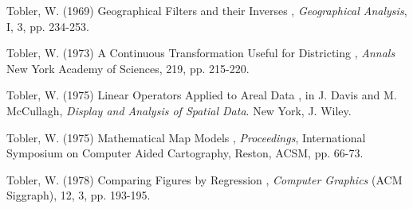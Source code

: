 \documentclass[a4paper,11pt]{article}
\begin{document}
{Tobler, W. (1969) \og Geographical Filters and their Inverses \fg, \emph{Geographical Analysis}, I, 3, pp. 234-253.

Tobler, W. (1973) \og A Continuous Transformation Useful for Districting \fg, \emph{Annals} New York Academy of Sciences, 219, pp. 215-220.

Tobler, W. (1975) \og Linear Operators Applied to Areal Data \fg, in J. Davis and M. McCullagh, \emph{Display and Analysis of Spatial Data}. New York, J. Wiley.

Tobler, W. (1975) \og Mathematical Map Models \fg, \emph{Proceedings}, International Symposium on Computer Aided Cartography, Reston, ACSM, pp. 66-73.

Tobler, W. (1978) \og Comparing Figures by Regression \fg, \emph{Computer Graphics} (ACM Siggraph), 12, 3, pp. 193-195.
}

\newpage


%
\end{document}
